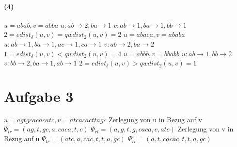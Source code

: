 \documentclass[a4paper,10pt]{article}
\begin{document}
\paragraph{(4)}
$u=abab, v=abba$\newline
$u: ab\to 2, ba\to 1$\newline
$v: ab\to 1, ba\to 1, bb\to 1$\newline
$2=edist_\delta(u,v)=qwdist_2(u,v)=2$\newline\newline
$u=abaca, v=ababa$\newline
$u: ab\to 1, ba\to 1, ac\to 1, ca\to 1$\newline
$v: ab\to 2, ba\to 2$\newline
$1=edist_\delta(u,v)<qwdist_2(u,v)=4$\newline\newline
$u=abbb, v=bbabb$\newline
$u: ab\to 1, bb\to 2$\newline
$v: bb\to 2, ba\to 1, ab\to 1$\newline
$2=edist_\delta(u,v)>qwdist_2(u,v)=1$\newline
\section*{Aufgabe 3}
$u=agtgcacacatc, v=atcacacttagc$\newline
Zerlegung von u in Bezug auf v\newline
$\Psi_{lr}=(ag,t,gc,a,caca,t,c)$\newline
$\Psi_{rl}=(a,g,t,g,caca,c,atc)$\newline
Zerlegung von v in Bezug auf u\newline
$\Psi_{lr}=(atc,a,cac,t,t,a,gc)$\newline
$\Psi_{rl}=(a,t,cacac,t,t,a,gc)$\newline
\end{document}

